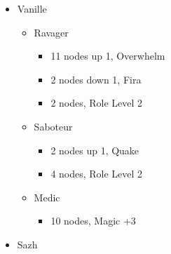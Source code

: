 \begin{paracol}{2}
\begin{menu}
\begin{itemize}
\begin{itemize}
				      \begin{itemize}
					      \item Commando
					            \begin{itemize}
						            \item 3 nodes, Blitz
					            \end{itemize}
					      \item Synergist
					            \begin{itemize}
						            \item 4 nodes 1 side, Accessory to the side
						            \item 8 nodes, Enfrost
					            \end{itemize}
					      \item Ravager
					            \begin{itemize}
						            \item 2 nodes, Strenght +7
					            \end{itemize}
				      \end{itemize}
				\item Vanille
				      \begin{itemize}
					      \item Ravager
					            \begin{itemize}
						            \item 11 nodes up 1, Overwhelm
						            \item 2 nodes down 1, Fira
						            \item 2 nodes, Role Level 2
					            \end{itemize}
					      \item Saboteur
					            \begin{itemize}
						            \item 2 nodes up 1, Quake
						            \item 4 nodes, Role Level 2
					            \end{itemize}
					      \item Medic
					            \begin{itemize}
						            \item 10 nodes, Magic +3
					            \end{itemize}
				      \end{itemize}
			\end{itemize}
			\equip
			\begin{itemize}
				\item Sazh

\end{itemize}
\end{itemize}
\end{menu}
\end{paracol}
